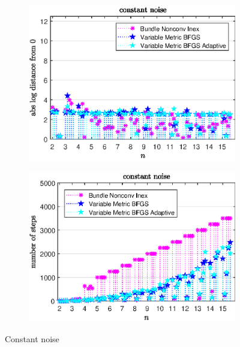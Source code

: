 \begin{figure}[H]
	\begin{subfigure}{0.49\textwidth}
		\includegraphics[width=\textwidth]{Pictures/Plots/constant_noise.eps}%
	\end{subfigure}
	\begin{subfigure}{0.49\textwidth}
		\includegraphics[width=\textwidth]{Pictures/Plots/steps_constant_noise.eps}%
	\end{subfigure}
	\caption{Constant noise}%
	\label{fig_const_noise}%
\end{figure}

